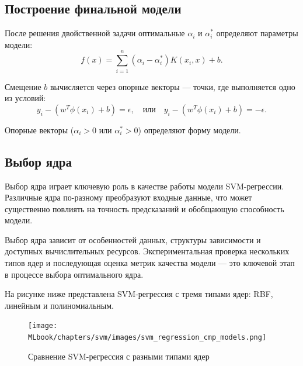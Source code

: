 \subsection{Построение финальной модели}
\par После решения двойственной задачи оптимальные \(\alpha_i\) и \(\alpha_i^*\) определяют параметры модели:
\begin{equation*}
    f(x) = \sum_{i=1}^n (\alpha_i - \alpha_i^*) K(x_i, x) + b.
\end{equation*}
\par Смещение \(b\) вычисляется через опорные векторы — точки, где выполняется одно из условий:
\begin{equation*}
    y_i - (w^T \phi(x_i) + b) = \epsilon, \quad \text{или} \quad y_i - (w^T \phi(x_i) + b) = -\epsilon.
\end{equation*}
\par Опорные векторы (\(\alpha_i > 0\) или \(\alpha_i^* > 0\)) определяют форму модели.

\subsection{Выбор ядра}
\par Выбор ядра играет ключевую роль в качестве работы модели SVM-регрессии. Различные ядра по-разному преобразуют входные данные, что может существенно повлиять на точность предсказаний и обобщающую способность модели.
\par Выбор ядра зависит от особенностей данных, структуры зависимости и доступных вычислительных ресурсов. Экспериментальная проверка нескольких типов ядер и последующая оценка метрик качества модели — это ключевой этап в процессе выбора оптимального ядра.
\par На рисунке ниже представлена SVM-регрессия с тремя типами ядер: RBF, линейным и полиномиальным. 
\begin{figure}[h!]
    \texttt{[image: MLbook/chapters/svm/images/svm\_regression\_cmp\_models.png]}
    \centering
    \caption{Сравнение SVM-регрессия с разными типами ядер}
    \label{fig:kernel_comparison}
\end{figure}


